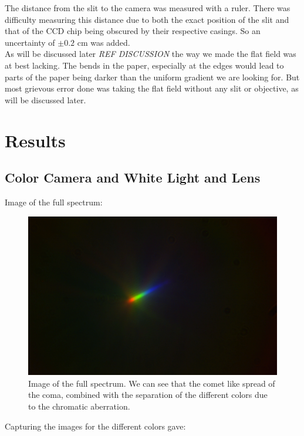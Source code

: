 \documentclass{emulateapj}
\begin{document}
The distance from the slit to the camera was measured with a ruler. There was difficulty measuring this distance due to both the exact position of the slit and that of the CCD chip being obscured by their respective casings. So an uncertainty of $\pm 0.2$ cm was added.\\

As will be discussed later \emph{REF DISCUSSION} the way we made the flat field was at best lacking. The bends in the paper, especially at the edges would lead to parts of the paper being darker than the uniform gradient we are looking for. But most grievous error done was taking the flat field without any slit or objective, as will be discussed later.




 
\section{Results}
\label{sec:results}


\subsection{Color Camera and White Light and Lens}
Image of the full spectrum:

\begin{figure}[H]
\centering
\includegraphics[scale=0.2]{spekter.png}
\caption{Image of the full spectrum. We can see that the comet like spread of the coma, combined with the separation of the different colors due to the chromatic aberration.}
\label{img:spekter}
\end{figure}

Capturing the images for the different colors gave:
\end{document}
